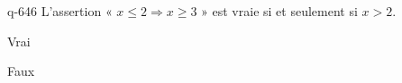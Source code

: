 \begin{truefalse}{q-646}
L'assertion « $x\leq 2 \Rightarrow x \geq 3$ » est vraie si et seulement si $x>2$.
\item* Vrai
\item Faux
\end{truefalse}

